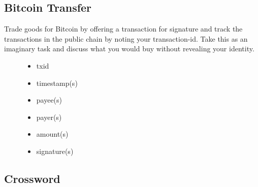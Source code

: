 \documentclass[english, DIV=calc, BCOR=5mm, fontsize=11pt, portrait]{scrartcl}	 %
\begin{document}
\begin{figure}[H]
\begin{minipage}{13cm}
	\end{minipage}
\end{figure}

\newpage 

\subsection{Bitcoin Transfer}

Trade goods for Bitcoin by offering a transaction for signature and track the transactions in the public chain by noting your transaction-id.
Take this as an imaginary task and discuss what you would buy without revealing your identity.

\begin{figure}[H]
	\begin{minipage}{4.5cm}
		\begin{itemize}
		\item txid
		\item timestamp(s)
		\end{itemize}
	\end{minipage}
	\begin{minipage}{4.5cm}
		\begin{itemize}
		\item payee(s)
		\item payer(s)
		\end{itemize}
	\end{minipage}
	\begin{minipage}{4.5cm}
		\begin{itemize}
		\item amount(s)
		\item signature(s)
		\end{itemize}
	\end{minipage}
\end{figure}

\subsection{Crossword}
\end{document}
